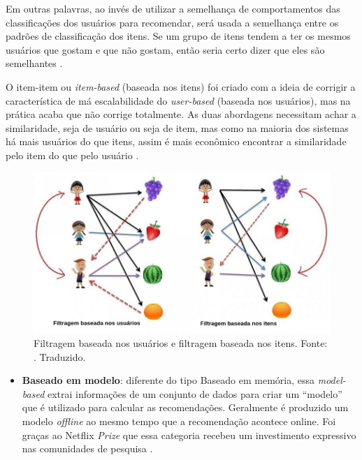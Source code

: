 Em outras palavras, ao invés de utilizar a semelhança de comportamentos das classificações dos usuários para recomendar, será usada a semelhança entre os padrões de classificação dos itens. Se um grupo de itens tendem a ter os mesmos usuários que gostam e que não gostam, então seria certo dizer que eles são semelhantes \cite{Ekstrand:2011:CFR:2185827.2185828}.

O item-item ou \textit{item-based} (baseada nos itens) foi criado com a ideia de corrigir a característica de má escalabilidade do \textit{user-based} (baseada nos usuários), mas na prática acaba que não corrige totalmente. As duas abordagens necessitam achar a similaridade, seja de usuário ou seja de item, mas como na maioria dos sistemas há mais usuários do que itens, assim é mais econômico encontrar a similaridade pelo item do que pelo usuário \cite{Ekstrand:2011:CFR:2185827.2185828}.

\begin{figure}[H]
    \centering
    \includegraphics[scale=0.4]{figuras/referencial_teorico/user_based_item_based.png}
    \caption[Filtragem baseada nos usuários e filtragem baseada nos itens]{Filtragem baseada nos usuários e filtragem baseada nos itens. Fonte: \cite{Pinela:2017}. Traduzido.}
    \label{fig:user_based_item_based}
\end{figure}


\begin{itemize}
    \item \textbf{Baseado em modelo}: diferente do tipo Baseado em memória, essa \textit{model-based} extrai informações de um conjunto de dados para criar um “modelo” que é utilizado para calcular as recomendações. Geralmente é produzido um modelo \textit{offline} ao mesmo tempo que a recomendação acontece online. Foi graças ao Netflix \textit{Prize} que essa categoria recebeu um investimento expressivo nas comunidades de pesquisa \cite{Levinas2014AnAO}.
\end{itemize}

